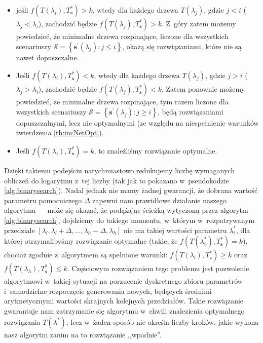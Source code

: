 \begin{itemize}
	\item jeśli $f \left( T \left( \lambda_{i} \right), T^{\ast}_{\textbf{s}} \right) > k$, wtedy dla każdego drzewa $T \left( \lambda_{j} \right)$, gdzie $j < i$ ($\lambda_{j} < \lambda_{i}$), zachodzić będzie $f \left( T \left( \lambda_{j} \right), T^{\ast}_{\textbf{s}} \right) > k$.
	Z~góry zatem możemy powiedzieć, że minimalne drzewa rozpinające, liczone dla wszystkich scenariuszy $\mathcal{S} = \left\{ \textbf{s}^{\prime} \left( \lambda_{j} \right) : j \leqslant i \right\}$, okażą się rozwiązaniami, które nie są nawet dopuszczalne.
	\item Jeśli $f \left( T \left( \lambda_{i} \right), T^{\ast}_{\textbf{s}} \right) < k$, wtedy dla każdego drzewa $T \left( \lambda_{j} \right)$, gdzie $j > i$ ($\lambda_{j} > \lambda_{i}$), zachodzić będzie $f \left( T \left( \lambda_{j} \right), T^{\ast}_{\textbf{s}} \right) < k$.
	Zatem ponownie możemy powiedzieć, że minimalne drzewa rozpinające, tym razem liczone dla wszystkich scenariuszy $\mathcal{S} = \left\{ \textbf{s}^{\prime} \left( \lambda_{j} \right) : j \geqslant i \right\}$, będą rozwiązaniami dopuszczalnymi, lecz nie optymalnymi (ze względu na niespełnienie warunków twierdzenia \ref{th:incNetOpt}).
	\item Jeśli $f \left( T \left( \lambda_{i} \right), T^{\ast}_{\textbf{s}} \right) = k$, to znaleźliśmy rozwiązanie optymalne.
\end{itemize}

Dzięki takiemu podejściu natychmiastowo redukujemy liczbę wymaganych obliczeń do logarytmu z~tej liczby (tak jak to pokazano w~pseudokodzie \ref{alg:binarysearch}).
Nadal jednak nie mamy żadnej gwarancji, że dobrana wartość parametru pomocniczego $\Delta$ zapewni nam prawidłowe działanie naszego algorytmu --- może się okazać, że podążając ścieżką wytyczoną przez algorytm \ref{alg:binarysearch}, dojdziemy do takiego momentu, w~którym w~rozpatrywanym przedziale $\left[ \lambda_{l}, \lambda_{l} + \Delta, \dots, \lambda_{h} - \Delta, \lambda_{h} \right]$ nie ma takiej wartości parametru $\lambda^{\ast}_{i}$, dla której otrzymalibyśmy rozwiązanie optymalne (takie, że $f \left( T \left( \lambda^{\ast}_{i} \right), T^{\ast}_{\textbf{s}} \right) = k$), chociaż zgodnie z~algorytmem są spełnione warunki: $f \left( T \left( \lambda_{l} \right), T^{\ast}_{\textbf{s}} \right) \geqslant k$ oraz $f \left( T \left( \lambda_{h} \right), T^{\ast}_{\textbf{s}} \right) \leqslant k$.
Częściowym rozwiązaniem tego problemu jest pozwolenie algorytmowi w~takiej sytuacji na porzucenie dyskretnego zbioru parametrów i~samodzielne rozpoczęcie generowania nowych, będących średnimi arytmetycznymi wartości skrajnych kolejnych przedziałów.
Takie rozwiązanie gwarantuje nam zatrzymanie się algorytmu w~chwili znalezienia optymalnego rozwiązania $T \left( \lambda^{\ast} \right)$, lecz w~żaden sposób nie określa liczby kroków, jakie wykona nasz algorytm zanim na to rozwiązanie ,,wpadnie''.

